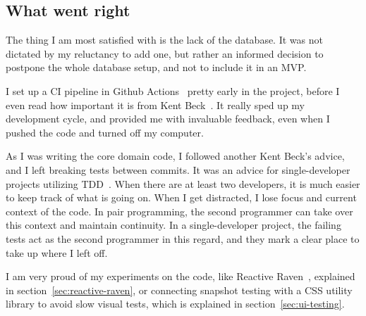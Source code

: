 \subsection{What went right}\label{sec:what-went-right}

The thing I am most satisfied with
is the lack of the database.
It was not dictated by my reluctancy to add one,
but rather an informed decision
to postpone the whole database setup,
and not to include it in an \ac{MVP}.

I set up a \ac{CI} pipeline
in Github Actions~\cite{github_inc_github_2022-1}
pretty early in the project,
before I even read how important it is
from Kent Beck~\cite{beck_extreme_2004}.
It really sped up my development cycle,
and provided me with invaluable feedback,
even when I pushed the code and turned off my computer.

As I was writing the core domain code,
I followed another Kent Beck's advice,
and I left breaking tests between commits.
It was an advice for single-developer projects
utilizing \ac{TDD}~\cite{beck_test-driven_2002}.
When there are at least two developers,
it is much easier to keep track of what is going on.
When I get distracted,
I lose focus and current context of the code.
In pair programming,
the second programmer can take over this context
and maintain continuity.
In a single-developer project,
the failing tests act as the second programmer
in this regard,
and they mark a clear place
to take up where I left off.

I am very proud of my experiments
on the code,
like Reactive Raven~\cite{sewera_reactive_2022},
explained in section~\ref{sec:reactive-raven},
or connecting snapshot testing
with a \ac{CSS} utility library
to avoid slow visual tests,
which is explained in section~\ref{sec:ui-testing}.
